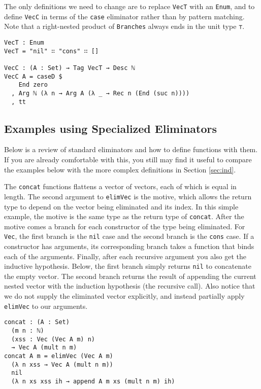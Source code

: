 \documentclass[preprint,nonatbib]{sigplanconf}
\begin{document}
The only definitions we need to change are to replace
{\tt VecT} with an {\tt Enum}, and to define
{\tt VecC} in terms of the {\tt case} eliminator rather than
by pattern matching. Note that a right-nested product of
{\tt Branches} always ends in the unit type {\tt ⊤}.

\begin{verbatim}
VecT : Enum
VecT = "nil" ∷ "cons" ∷ []

VecC : (A : Set) → Tag VecT → Desc ℕ
VecC A = caseD $
    End zero
  , Arg ℕ (λ n → Arg A (λ _ → Rec n (End (suc n))))
  , tt
\end{verbatim}

\subsection{Examples using Specialized Eliminators}
\label{sec:background:elim}

Below is a review of standard eliminators and how to define functions
with them. If you are already comfortable with this, you still may
find it useful to compare the examples below with the more complex
definitions in Section \ref{sec:ind}.

The {\tt concat} functions flattens a vector of vectors,
each of which is equal in length. The second argument to {\tt elimVec}
is the motive, which allows the return type to depend on the vector
being eliminated and its index. In this simple example, the motive is
the same type as the return type of {\tt concat}. After the motive
comes a branch for each constructor of the type being eliminated. For
{\tt Vec}, the first branch is the {\tt nil} case and the second
branch is the {\tt cons} case. If a constructor has arguments, its
corresponding branch takes a function that binds each of the
arguments. Finally, after each recursive argument you also get the
inductive hypothesis. Below, the first branch simply returns
{\tt nil} to concatenate the empty vector. The second branch
returns the result of appending the current nested vector with
the induction hypothesis (the recursive call). Also notice that we
do not supply the eliminated vector explicitly, and instead partially
apply {\tt elimVec} to our arguments.

\begin{verbatim}
concat : (A : Set)
  (m n : ℕ)
  (xss : Vec (Vec A m) n)
  → Vec A (mult n m)
concat A m = elimVec (Vec A m)
  (λ n xss → Vec A (mult n m))
  nil
  (λ n xs xss ih → append A m xs (mult n m) ih)
\end{verbatim}
\end{document}
